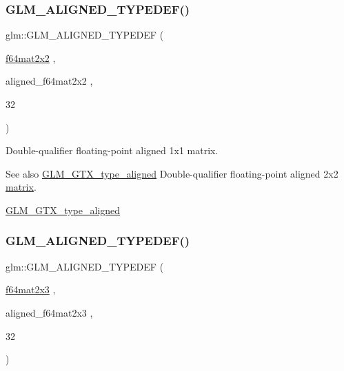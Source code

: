 \subsubsection{\texorpdfstring{G\+L\+M\+\_\+\+A\+L\+I\+G\+N\+E\+D\+\_\+\+T\+Y\+P\+E\+D\+E\+F()}{GLM\_ALIGNED\_TYPEDEF()}\hspace{0.1cm}{\footnotesize\ttfamily [196/209]}}
{\footnotesize\ttfamily glm\+::\+G\+L\+M\+\_\+\+A\+L\+I\+G\+N\+E\+D\+\_\+\+T\+Y\+P\+E\+D\+EF (\begin{DoxyParamCaption}\item[{\hyperlink{group__gtc__type__precision_gae18de078e2885803ceda215c6e04a08a}{f64mat2x2}}]{,  }\item[{aligned\+\_\+f64mat2x2}]{,  }\item[{32}]{ }\end{DoxyParamCaption})}

Double-\/qualifier floating-\/point aligned 1x1 matrix. \begin{DoxySeeAlso}{See also}
\hyperlink{group__gtx__type__aligned}{G\+L\+M\+\_\+\+G\+T\+X\+\_\+type\+\_\+aligned} Double-\/qualifier floating-\/point aligned 2x2 \hyperlink{_s_d_l__opengl__glext_8h_a7b24a3f2f56eb1244ae69dacb4fecb6f}{matrix}. 

\hyperlink{group__gtx__type__aligned}{G\+L\+M\+\_\+\+G\+T\+X\+\_\+type\+\_\+aligned} 
\end{DoxySeeAlso}
\mbox{\label{group__gtx__type__aligned_gab059d7b9fe2094acc563b7223987499f}} 
\subsubsection{\texorpdfstring{G\+L\+M\+\_\+\+A\+L\+I\+G\+N\+E\+D\+\_\+\+T\+Y\+P\+E\+D\+E\+F()}{GLM\_ALIGNED\_TYPEDEF()}\hspace{0.1cm}{\footnotesize\ttfamily [197/209]}}
{\footnotesize\ttfamily glm\+::\+G\+L\+M\+\_\+\+A\+L\+I\+G\+N\+E\+D\+\_\+\+T\+Y\+P\+E\+D\+EF (\begin{DoxyParamCaption}\item[{\hyperlink{group__gtc__type__precision_ga7816d266eaf216e384c3c6d1e570b9f3}{f64mat2x3}}]{,  }\item[{aligned\+\_\+f64mat2x3}]{,  }\item[{32}]{ }\end{DoxyParamCaption})}

